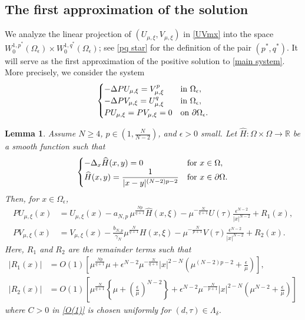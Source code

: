 \documentclass[reqno]{amsart}
\newtheorem{lemma}[theorem]{Lemma}
\theoremstyle{remark}
\newcommand{\pa}{\partial}
\newcommand{\ep}{\epsilon}
\newcommand{\ga}{\gamma}
\newcommand{\R}{\mathbb{R}}
\newcommand{\whh}{\widehat{H}}
\newcommand{\mx}{{\mu,\xi}}
\renewcommand{\(}{\left(}
\renewcommand{\)}{\right)}
\numberwithin{equation}{section}
\begin{document}
\subsection{The first approximation of the solution}
We analyze the linear projection of $(U_\mx,V_\mx)$ in \eqref{UVmx} into the space $W_0^{1,p^\ast}(\Omega_\ep) \times W_0^{1,q^\ast}(\Omega_\ep)$; see \eqref{pq star} for the definition of the pair $(p^*,q^*)$.
It will serve as the first approximation of the positive solution to \eqref{main system}. More precisely, we consider the system
\begin{equation}\label{PUPV eq}
\begin{cases}
-\Delta PU_\mx=V_\mx^p &\textup{in } \Omega_\ep,\\
-\Delta PV_\mx=U_\mx^q &\textup{in } \Omega_\ep,\\
PU_\mx=PV_\mx=0 &\textup{on } \pa \Omega_\ep.
\end{cases}
\end{equation}
\begin{lemma}\label{first app}
Assume $N \ge 4$, $p \in (1,\frac{N}{N-2})$, and $\ep > 0$ small. Let $\whh:\Omega \times \Omega\to \R$ be a smooth function such that
\begin{equation}\label{whh}
\begin{cases}
-\Delta_x \whh(x,y)=0 &\textup{for } x \in \Omega,\\
\displaystyle \whh(x,y)=\frac{1}{|x-y|^{(N-2)p-2}} &\textup{for } x \in \pa \Omega.
\end{cases}
\end{equation}
Then, for $x \in \Omega_\ep$,
\begin{align}
PU_\mx(x) &= U_\mx(x) - a_{N,p}\, \mu^{\frac{Np}{q+1}}\whh(x,\xi) - \mu^{-\frac{N}{q+1}}U(\tau)\frac{\ep^{N-2}}{|x|^{N-2}} + R_1(x), \label{approx for pu}\\
PV_\mx(x) &= V_\mx(x) - \frac{b_{N,p}}{\ga_N}\mu^{\frac{N}{q+1}}H(x,\xi) - \mu^{-\frac{N}{p+1}}V(\tau)\frac{\ep^{N-2}}{|x|^{N-2}} + R_2(x). \label{approx for pv}
\end{align}
Here, $R_1$ and $R_2$ are the remainder terms such that
\begin{align*}
|R_1(x)| &= O(1)\left[\mu^{\frac{Np}{q+1}} \mu + \ep^{N-2}\mu^{-\frac{N}{q+1}}|x|^{2-N}\(\mu^{(N-2)p-2} + \frac{\ep}{\mu}\)\right],\\
|R_2(x)| &= O(1)\left[\mu^{\frac{N}{q+1}} \left\{\mu + \(\frac{\ep}{\mu}\)^{N-2}\right\} + \ep^{N-2}\mu^{-\frac{N}{p+1}} |x|^{2-N} \(\mu^{N-2}+\frac{\ep}{\mu}\)\right]
\end{align*}
where $C > 0$ in \eqref{O(1)} is chosen uniformly for $(d,\tau)\in \Lambda_\delta$.
\end{lemma}
\end{document}

